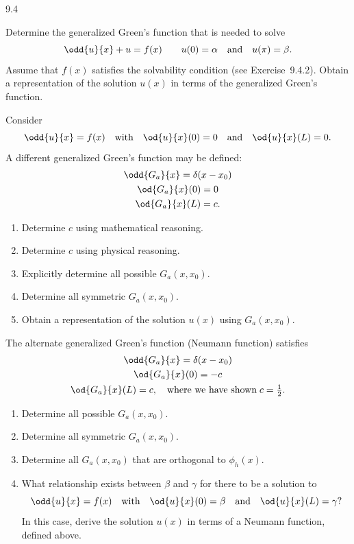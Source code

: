 \begin{exercises}{9.4}
\item[\starred 9.4.10.] Determine the generalized Green's function that is needed to solve
\[
\odd{u}{x} + u = f(x) \qquad u(0) = \alpha \quad\text{and}\quad u(\pi) = \beta.
\]
Assume that $f(x)$ satisfies the solvability condition (see Exercise~9.4.2).  Obtain a representation of the solution $u(x)$ in terms of the generalized Green's function.

\item Consider
\[
\odd{u}{x} = f(x) \quad\text{with}\quad \od{u}{x}(0) = 0 \quad\text{and}\quad \od{u}{x}(L) = 0.
\]
A different generalized Green's function may be defined:
\begin{gather*}
\odd{G_a}{x} = \delta(x - x_0) \\
\od{G_a}{x}(0) = 0 \\
\od{G_a}{x}(L) = c.
\end{gather*}
\begin{enumerate}
\item[\starred(a)] Determine $c$ using mathematical reasoning.
\item[\starred(b)] Determine $c$ using physical reasoning.
\item[(c)] Explicitly determine all possible $G_a(x,x_0)$.
\item[\starred(d)] Determine all symmetric $G_a(x,x_0)$.
\item[\starred(e)] Obtain a representation of the solution $u(x)$ using $G_a(x,x_0)$.
\end{enumerate}

\item The alternate generalized Green's function (Neumann function) satisfies
\begin{gather*}
\odd{G_a}{x} = \delta(x - x_0) \\
\od{G_a}{x}(0) = -c \\
\od{G_a}{x}(L) = c, \quad\text{where we have shown}\; c = \tfrac{1}{2}.
\end{gather*}
\begin{enumerate}
\item[(a)] Determine all possible $G_a(x,x_0)$.
\item[(b)] Determine all symmetric $G_a(x,x_0)$.
\item[(c)] Determine all $G_a(x,x_0)$ that are orthogonal to $\phi_h(x)$.
\item[(d)] What relationship exists between $\beta$ and $\gamma$ for there to be a solution to
\[
\odd{u}{x} = f(x) \quad\text{with}\quad \od{u}{x}(0) = \beta \quad\text{and}\quad \od{u}{x}(L) = \gamma?
\]
In this case, derive the solution $u(x)$ in terms of a Neumann function, defined above.
\end{enumerate}


\end{exercises}
